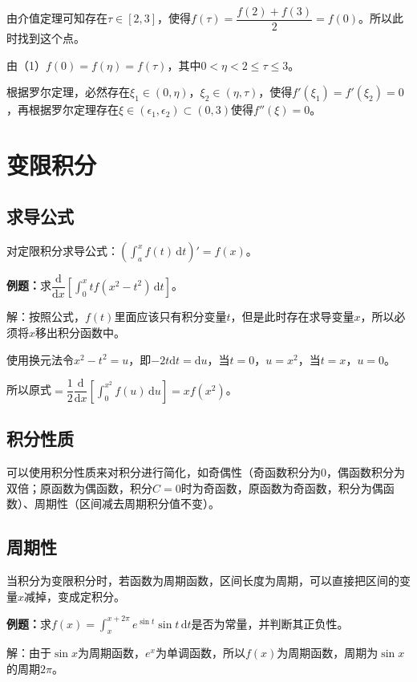 \documentclass[UTF8, 12pt]{ctexart}
\begin{document}
由介值定理可知存在$\tau\in[2,3]$，使得$f(\tau)=\dfrac{f(2)+f(3)}{2}=f(0)$。所以此时找到这个点。

由（1）$f(0)=f(\eta)=f(\tau)$，其中$0<\eta<2\leqslant\tau\leqslant3$。

根据罗尔定理，必然存在$\xi_1\in(0,\eta)$，$\xi_2\in(\eta,\tau)$，使得$f'(\xi_1)=f'(\xi_2)=0$，再根据罗尔定理存在$\xi\in(\epsilon_1,\epsilon_2)\subset(0,3)$使得$f''(\xi)=0$。

\section{变限积分}

\subsection{求导公式}

对定限积分求导公式：$(\int_a^xf(t)\,\textrm{d}t)'=f(x)$。

\textbf{例题：}求$\dfrac{\textrm{d}}{\textrm{d}x}[\int_0^xtf(x^2-t^2)\,\textrm{d}t]$。

解：按照公式，$f(t)$里面应该只有积分变量$t$，但是此时存在求导变量$x$，所以必须将$x$移出积分函数中。

使用换元法令$x^2-t^2=u$，即$-2t\textrm{d}t=\textrm{d}u$，当$t=0$，$u=x^2$，当$t=x$，$u=0$。

所以原式$=\dfrac{1}{2}\dfrac{\textrm{d}}{\textrm{d}x}[\int_0^{x^2}f(u)\,\textrm{d}u]=xf(x^2)$。

\subsection{积分性质}

可以使用积分性质来对积分进行简化，如奇偶性（奇函数积分为0，偶函数积分为双倍；原函数为偶函数，积分$C=0$时为奇函数，原函数为奇函数，积分为偶函数）、周期性（区间减去周期积分值不变）。

\subsection{周期性}

当积分为变限积分时，若函数为周期函数，区间长度为周期，可以直接把区间的变量$x$减掉，变成定积分。

\textbf{例题：}求$f(x)=\int_x^{x+2\pi}e^{\sin t}\sin t\,\textrm{d}t$是否为常量，并判断其正负性。

解：由于$\sin x$为周期函数，$e^x$为单调函数，所以$f(x)$为周期函数，周期为$\sin x$的周期$2\pi$。
\end{document}
